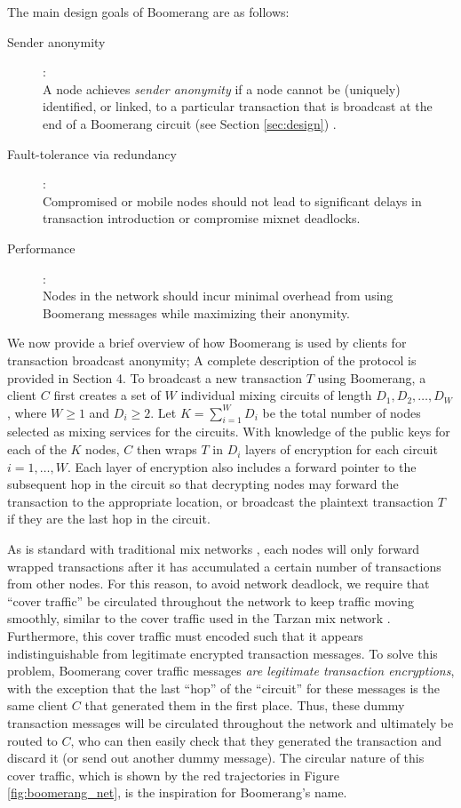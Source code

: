 The main design goals of Boomerang are as follows:
\begin{description}
	\item[Sender anonymity]: \\A node achieves \emph{sender anonymity} if a node cannot be (uniquely) identified, or linked, to a particular transaction that is broadcast at the end of a Boomerang circuit (see Section \ref{sec:design}) \cite{AnonymityTerms}. 
	\item[Fault-tolerance via redundancy]: \\Compromised or mobile nodes should not lead to significant delays in transaction introduction or compromise mixnet deadlocks.
	\item[Performance]: \\Nodes in the network should incur minimal overhead from using Boomerang messages while maximizing their anonymity.
\end{description}

We now provide a brief overview of how Boomerang is used by clients for transaction broadcast anonymity; A complete description of the protocol is provided in Section 4. To broadcast a new transaction $T$ using Boomerang, a client $C$ first creates a set of $W$ individual mixing circuits of length $D_1,D_2,\dots,D_W$, where $W \geq 1$ and $D_i \geq 2$. Let $K = \sum_{i=1}^WD_i$ be the total number of nodes selected as mixing services for the circuits. With knowledge of the public keys for each of the $K$ nodes, $C$ then wraps $T$ in $D_i$ layers of encryption for each circuit $i = 1,\dots,W$. Each layer of encryption also includes a forward pointer to the subsequent hop in the circuit so that decrypting nodes may forward the transaction to the appropriate location, or broadcast the plaintext transaction $T$ if they are the last hop in the circuit. 

As is standard with traditional mix networks \cite{Chaum81-Mix}, each nodes will only forward wrapped transactions after it has accumulated a certain number of transactions from other nodes. For this reason, to avoid network deadlock, we require that ``cover traffic'' be circulated throughout the network to keep traffic moving smoothly, similar to the cover traffic used in the Tarzan mix network \cite{tarzan}. Furthermore, this cover traffic must encoded such that it appears indistinguishable from legitimate encrypted transaction messages. To solve this problem, Boomerang cover traffic messages \emph{are legitimate transaction encryptions}, with the exception that the last ``hop'' of the ``circuit'' for these messages is the same client $C$ that generated them in the first place. Thus, these dummy transaction messages will be circulated throughout the network and ultimately be routed to $C$, who can then easily check that they generated the transaction and discard it (or send out another dummy message). The circular nature of this cover traffic, which is shown by the red trajectories in Figure \ref{fig:boomerang_net}, is the inspiration for Boomerang's name.

